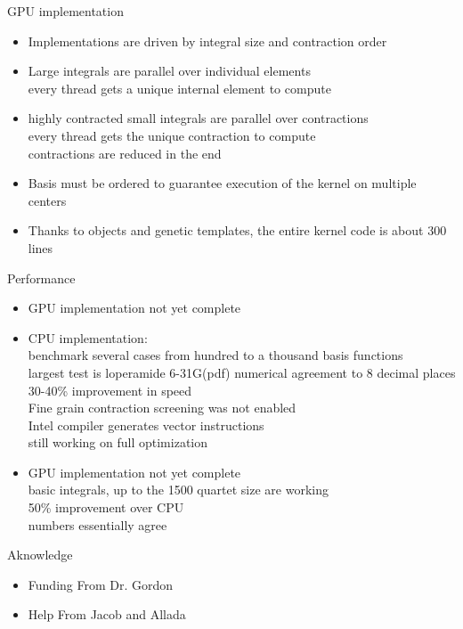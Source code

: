 \documentclass{beamer}
\begin{document}
\begin{frame}{  GPU implementation}
\begin{itemize}
\item Implementations are driven by integral size and contraction order
\item Large integrals are parallel over individual elements\\
every thread gets a unique internal element to compute
\item highly contracted small integrals are parallel over contractions\\
every thread gets the unique contraction to compute\\
contractions are  reduced in the end
\item Basis  must be ordered to guarantee execution of the kernel on multiple centers
\item Thanks to objects and genetic templates, the entire kernel code is about 300 lines
\end{itemize}
\end{frame}

\begin{frame}{   Performance}
\begin{itemize}
\item GPU implementation not yet complete
\item CPU implementation:\\
  benchmark several cases from hundred to a thousand basis functions\\
  largest test is loperamide 6-31G(pdf)
  numerical agreement to 8 decimal places\\
  30-40\% improvement in speed\\
  Fine grain contraction screening was not enabled\\
  Intel compiler generates vector instructions\\
  still working on full optimization
\item GPU implementation not yet complete\\
  basic integrals, up to the 1500 quartet size are working\\
  50\% improvement over CPU\\
  numbers essentially agree
\end{itemize}
\end{frame}


\begin{frame}{Aknowledge}
\begin{itemize}
\item Funding From Dr. Gordon
\item  Help From Jacob and Allada
\end{itemize}
\end{frame}
\end{document}
